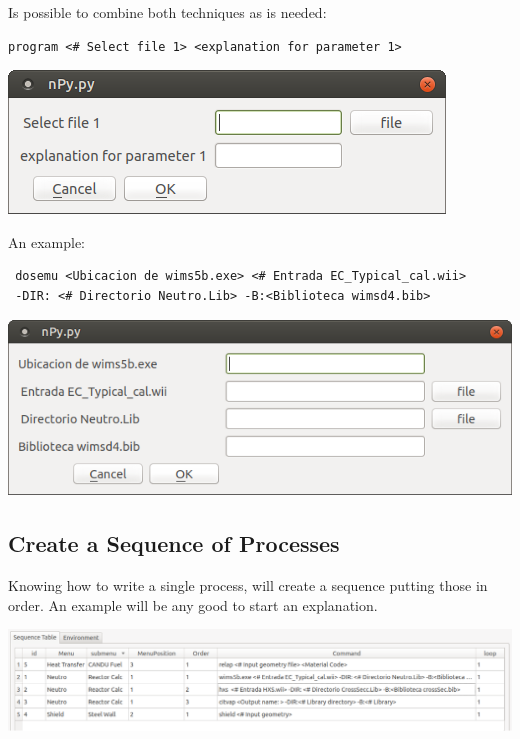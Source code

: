 \documentclass[a4paper,10pt]{article}
\begin{document}
\noindent Is possible to combine both techniques as is needed:

\begin{verbatim}
program <# Select file 1> <explanation for parameter 1>
 \end{verbatim}

 \begin{center}
 \includegraphics[width=\textwidth]{img/contextMenuExampleCombined.png}
\end{center}

\noindent An example:

\begin{verbatim}
 dosemu <Ubicacion de wims5b.exe> <# Entrada EC_Typical_cal.wii> 
 -DIR: <# Directorio Neutro.Lib> -B:<Biblioteca wimsd4.bib>
 \end{verbatim}

\begin{center}
 \includegraphics[width=\textwidth]{img/contextMenuCombined.png}
\end{center}

\subsection{Create a Sequence of Processes}

Knowing how to write a single process, will create a sequence putting those in order. An example will be any good to start an explanation. 

\begin{center}
 \includegraphics[width=\textwidth]{img/orderingSequence.png}
\end{center}
\end{document}
